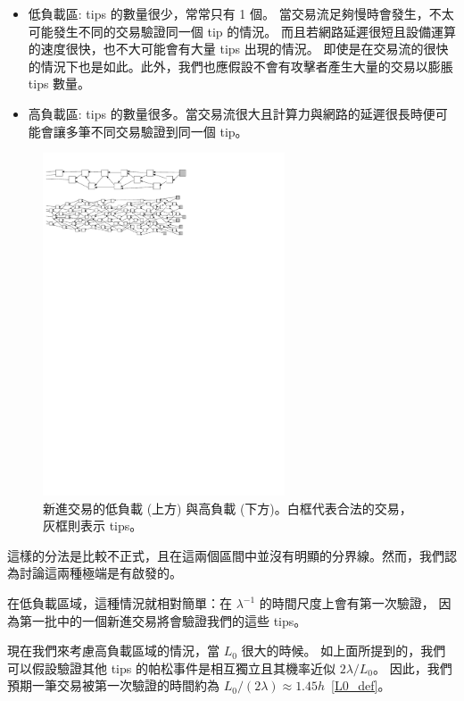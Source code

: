 \documentclass[12pt]{article}
\begin{document}
\begin{CJK}{UTF8}{bkai}
\begin{itemize}
 \item 低負載區: tips 的數量很少，常常只有 1 個。
 當交易流足夠慢時會發生，不太可能發生不同的交易驗證同一個 tip 的情況。
 而且若網路延遲很短且設備運算的速度很快，也不大可能會有大量 tips 出現的情況。
 即使是在交易流的很快的情況下也是如此。此外，我們也應假設不會有攻擊者產生大量的交易以膨脹 tips 數量。
 \item 高負載區: tips 的數量很多。當交易流很大且計算力與網路的延遲很長時便可能會讓多筆不同交易驗證到同一個 tip。
\end{itemize}
\begin{figure}
 \centering \includegraphics[width=0.64\textwidth]{regimes} 
\caption{新進交易的低負載 (上方) 與高負載 (下方)。白框代表合法的交易，灰框則表示 tips。}
\label{f_regimes}
\end{figure}

這樣的分法是比較不正式，且在這兩個區間中並沒有明顯的分界線。然而，我們認為討論這兩種極端是有啟發的。

在低負載區域，這種情況就相對簡單：在 $\lambda^{-1}$ 的時間尺度上會有第一次驗證， 
因為第一批中的一個新進交易將會驗證我們的這些 tips。

現在我們來考慮高負載區域的情況，當 $L_0$ 很大的時候。
如上面所提到的，我們可以假設驗證其他 tips 的帕松事件是相互獨立且其機率近似 $2\lambda/L_0$。
因此，我們預期一筆交易被第一次驗證的時間約為 $L_0/(2\lambda)\approx1.45h$~\eqref{L0_def}。


\end{CJK}
\end{document}
